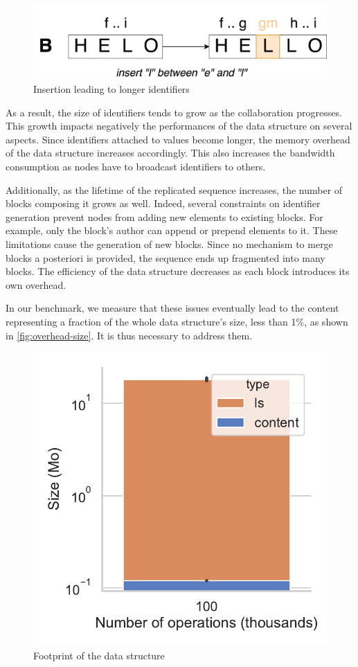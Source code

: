 \documentclass[sigplan,10pt]{acmart}
\begin{document}
\begin{figure}
    \centering
    \includegraphics[width=0.6\columnwidth]{img/insert-between.png}
    \caption{Insertion leading to longer identifiers}
    \label{fig:example-split}
\end{figure}

As a result, the size of identifiers tends to grow as the collaboration progresses.
This growth impacts negatively the performances of the data structure on several aspects.
Since identifiers attached to values become longer, the memory overhead of the data structure increases accordingly.
This also increases the bandwidth consumption as nodes have to broadcast identifiers to others.

Additionally, as the lifetime of the replicated sequence increases, the number of blocks composing it grows as well.
Indeed, several constraints on identifier generation prevent nodes from adding new elements to existing blocks.
For example, only the block's author can append or prepend elements to it.
These limitations cause the generation of new blocks.
Since no mechanism to merge blocks a posteriori is provided, the sequence ends up fragmented into many blocks.
The efficiency of the data structure decreases as each block introduces its own overhead.

In our benchmark, we measure that these issues eventually lead to the content representing a fraction of the whole data structure's size, less than 1\%, as shown in \autoref{fig:overhead-size}. It is thus necessary to address them.

\begin{figure}
    \centering
    \includegraphics[width=0.55\columnwidth]{img/overhead-size.pdf}
    \caption{Footprint of the data structure}
    \label{fig:overhead-size}
\end{figure}
\end{document}
